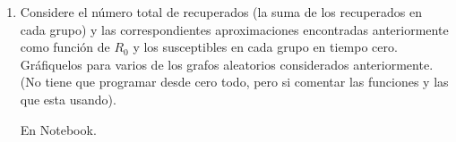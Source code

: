 \documentclass[answers]{exam}
\begin{document}
\begin{questions}
\begin{enumerate}
\item Considere el n\'umero total de recuperados (la suma de los recuperados en cada grupo) y las correspondientes aproximaciones encontradas anteriormente como funci\'on de $R_0$ y los susceptibles en cada grupo en tiempo cero. Gr\'afiquelos para varios de los grafos aleatorios considerados anteriormente. (No tiene que programar desde cero todo, pero si comentar las funciones y las que esta usando).

\begin{solution}
En Notebook.
\end{solution}

\end{enumerate}

\end{questions}
\end{document}
